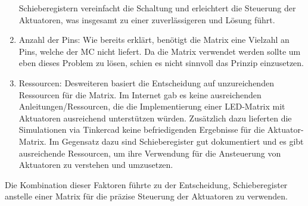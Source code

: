 \begin{enumerate}
	Schieberegistern vereinfacht die Schaltung und erleichtert die Steuerung der Aktuatoren, was insgesamt zu einer
	zuverlässigeren und Lösung führt. %
	\item Anzahl der Pins: Wie bereits erklärt, benötigt die Matrix eine Vielzahl an Pins, welche der \ac{MC} %
	nicht liefert. Da die Matrix verwendet werden sollte um eben dieses Problem zu lösen, schien es nicht sinnvoll
	das Prinzip einzusetzen. %
	\item Ressourcen: Desweiteren basiert die Entscheidung auf unzureichenden Ressourcen für die Matrix. Im Internet gab es
	keine ausreichenden Anleitungen/Ressourcen, die die Implementierung einer LED-Matrix mit Aktuatoren ausreichend
	unterstützen würden. Zusätzlich dazu lieferten die Simulationen via Tinkercad keine befriedigenden Ergebnisse %
	für die Aktuator-Matrix.
	Im Gegensatz dazu sind Schieberegister gut dokumentiert und es gibt ausreichende Ressourcen, um ihre
	Verwendung für die Ansteuerung von Aktuatoren zu verstehen und umzusetzen.
\end{enumerate}

Die Kombination dieser Faktoren führte zu der Entscheidung, Schieberegister anstelle einer Matrix für die präzise Steuerung der Aktuatoren zu verwenden. %


